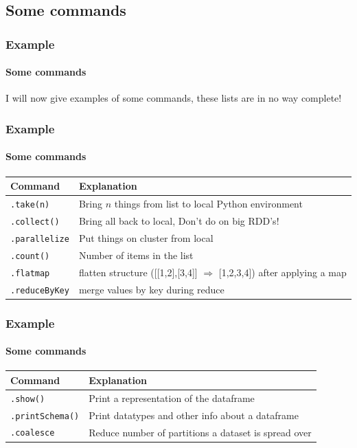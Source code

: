\documentclass[aspectratio=169,usenames,dvipsnames]{beamer}
\begin{document}
    \subsection{Some commands}
    \begin{frame}
        \frametitle{Example}
        \framesubtitle{Some commands}
        I will now give examples of some commands, these lists are in no way complete!
    \end{frame}

    \begin{frame}
        \frametitle{Example}
        \framesubtitle{Some commands}
            \begin{center}
            \begin{tabular}{ll}
            \toprule
            Command & Explanation \\
            \midrule
            \texttt{.take(n)} & Bring $n$ things from list to local Python environment \\
            \texttt{.collect()} & Bring all back to local, \alert{Don't do on big RDD's!} \\
            \texttt{.parallelize} & Put things on cluster from local \\
            \texttt{.count()} & Number of items in the list \\
            \texttt{.flatmap} & flatten structure ([[1,2],[3,4]] $\Rightarrow$ [1,2,3,4]) after applying a map \\
            \texttt{.reduceByKey} & merge values by key during reduce \\
            \bottomrule
            \end{tabular}
            \end{center}
        \oldEndBlock{}
    \end{frame}
    
    \begin{frame}
        \frametitle{Example}
        \framesubtitle{Some commands}
            \begin{center}
            \begin{tabular}{ll}
            \toprule
            Command & Explanation \\
            \midrule
            \texttt{.show()} & Print a representation of the dataframe \\
            \texttt{.printSchema()} & Print datatypes and other info about a dataframe \\
            \texttt{.coalesce} & Reduce number of partitions a dataset is spread over \\
            \bottomrule
            \end{tabular}
            \end{center}
        \oldEndBlock{}
    \end{frame}
\end{document}

